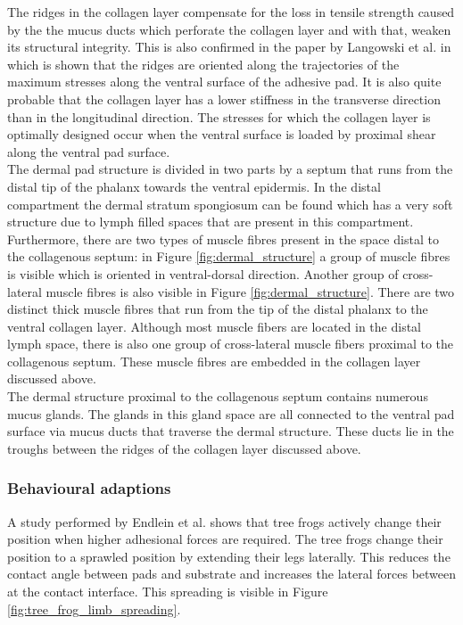 \qquad The ridges in the collagen layer compensate for the loss in tensile strength caused by the the mucus ducts which perforate the collagen layer and with that, weaken its structural integrity. This is also confirmed in the paper by Langowski et al. in which is shown that the ridges are oriented along the trajectories of the maximum stresses along the ventral surface of the adhesive pad. It is also quite probable that the collagen layer has a lower stiffness in the transverse direction than in the longitudinal direction. The stresses for which the collagen layer is optimally designed occur when the ventral surface is loaded by proximal shear along the ventral pad surface.\\ 
    
\qquad The dermal pad structure is divided in two parts by a septum that runs from the distal tip of the phalanx towards the ventral epidermis. In the distal compartment the dermal stratum spongiosum can be found which has a very soft structure due to lymph filled spaces that are present in this compartment. Furthermore, there are two types of muscle fibres present in the space distal to the collagenous septum: in Figure \ref{fig:dermal_structure} a group of muscle fibres is visible which is oriented in ventral-dorsal direction. Another group of cross-lateral muscle fibres is also visible in Figure \ref{fig:dermal_structure}. There are two distinct thick muscle fibres that run from the tip of the distal phalanx to the ventral collagen layer. Although most muscle fibers are located in the distal lymph space, there is also one group of cross-lateral muscle fibers proximal to the collagenous septum. These muscle fibres are embedded in the collagen layer discussed above.\\ 
\qquad The dermal structure proximal to the collagenous septum contains numerous mucus glands. The glands in this gland space are all connected to the ventral pad surface via mucus ducts that traverse the dermal structure. These ducts lie in the troughs between the ridges of the collagen layer discussed above.\\

\subsubsection{Behavioural adaptions}\label{sec:intro_spreading}
\qquad A study performed by Endlein et al. \cite{endlein2013sticking} shows that tree frogs actively change their position when higher adhesional forces are required. The tree frogs change their position to a sprawled position by extending their legs laterally. This reduces the contact angle between pads and substrate and increases the lateral forces between at the contact interface. This spreading is visible in Figure \ref{fig:tree_frog_limb_spreading}. 


